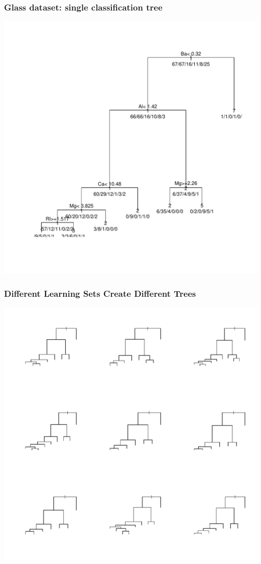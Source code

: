 \documentclass[bigger]{beamer}
\begin{document}
\begin{frame}
\frametitle{Glass dataset: single classification tree}
\label{sec-1-1-5}


\includegraphics[width=.9\linewidth]{./onetree.pdf}
\end{frame}
\begin{frame}
\frametitle{Different Learning Sets Create Different Trees}
\label{sec-1-1-6}


\includegraphics[width=.9\linewidth]{./diffTrees.pdf}
\end{frame}
\end{document}
